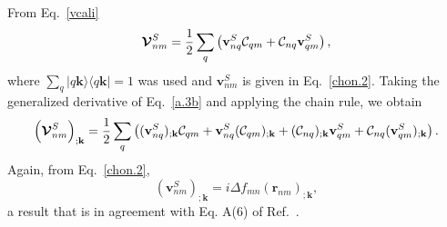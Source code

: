 \documentclass[floatfix,prb,aps,superscriptaddress,showpacs,11pt,preprint,letterpaper]{revtex4}
\begin{document}
From Eq.~\eqref{vcali}
\begin{equation}
\boldsymbol{\mathcal{\cal V}}^{S}_{nm}
=
\frac{1}{2}\sum_q\left(   
\mathbf{v}^S_{nq}{\mathbf{\cal C}}_{qm}+{\mathbf{\cal C}}_{nq}\mathbf{v}^S_{qm}
\right)  
,
\label{a.3b}
\end{equation}    
where $\sum_q | q\mathbf{k}\rangle\langle q\mathbf{k} | =1$ was used
and $\mathbf{v}^S_{nm}$ is given in Eq.~\eqref{chon.2}.
Taking the generalized derivative of Eq.~\eqref{a.3b}
and applying
the chain rule, we obtain
\begin{equation*}
\left(\boldsymbol{\mathcal{\cal V}}^{S}_{nm}\right)_{;\mathbf{k}}
=
\frac{1}{2}\sum_q\left(
(\mathbf{v}^S_{nq})_{;\mathbf{k}}{\mathbf{\cal C}}_{qm}
+    
\mathbf{v}^S_{nq}({\mathbf{\cal C}}_{qm})_{;\mathbf{k}}
+
({\mathbf{\cal C}}_{nq})_{;\mathbf{k}} \mathbf{v}^S_{qm}
+
{\mathbf{\cal C}}_{nq} (\mathbf{v}^S_{qm})_{;\mathbf{k}}
\right)  
.
\end{equation*}    
Again, from
Eq.~\eqref{chon.2}, 
\begin{equation*}
(\mathbf{v}^S_{nm})_{;\mathbf{k}}=i\Delta f_{mn}
(\mathbf{r}_{nm})_{;\mathbf{k}}
,
\end{equation*}
a result that is in agreement with Eq. A(6) of Ref.~.


\end{document}

